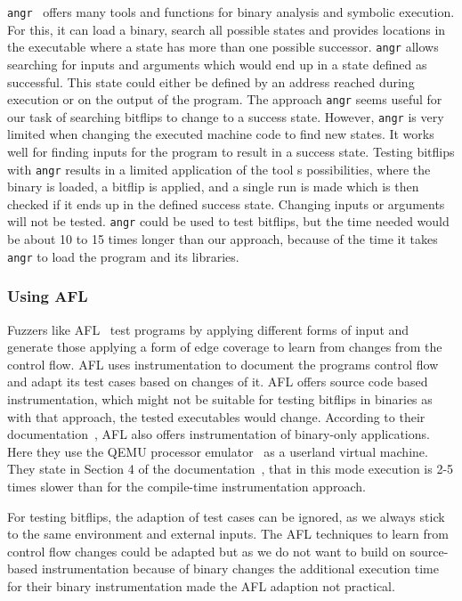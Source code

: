 \texttt{angr}~\cite{angrpaper} offers many tools and functions for binary
analysis and symbolic execution. For this, it can load a binary, search all
possible states and provides locations in the executable where a state has more
than one possible successor. \texttt{angr} allows searching for inputs and
arguments which would end up in a state defined as successful. This state could
either be defined by an address reached during execution or on the output of the
program. The approach \texttt{angr} seems useful for our task of searching
bitflips to change to a success state. However, \texttt{angr} is very limited
when changing the executed machine code to find new states. It works well for
finding inputs for the program to result in a success state. Testing bitflips
with \texttt{angr} results in a limited application of the tool\textquotesingle
s possibilities, where the binary is loaded, a bitflip is applied, and a single
run is made which is then checked if it ends up in the defined success state.
Changing inputs or arguments will not be tested. \texttt{angr} could be used to
test bitflips, but the time needed would be about \num{10} to \num{15} times
longer than our approach, because of the time it takes \texttt{angr} to load
the program and its libraries.

\subsubsection{Using AFL}

Fuzzers like AFL~\cite{aflweb} test programs by applying different forms of
input and generate those applying a form of edge coverage to learn from changes
from the control flow. AFL uses instrumentation to document the
program\textquotesingle s control flow and adapt its test cases based on changes
of it. AFL offers source code based instrumentation, which might not be suitable
for testing bitflips in binaries as with that approach, the tested executables
would change. According to their documentation~\cite{aflreadme}, AFL also offers
instrumentation of binary-only applications. Here they use the QEMU processor
emulator~\cite{qemuweb} as a userland virtual machine. They state in Section 4
of the documentation~\cite{aflreadme}, that in this mode execution is 2-5 times
slower than for the compile-time instrumentation approach.

For testing bitflips, the adaption of test cases can be ignored, as we always
stick to the same environment and external inputs. The AFL techniques to learn
from control flow changes could be adapted but as we do not want to build on
source-based instrumentation because of binary changes the additional execution
time for their binary instrumentation made the AFL adaption not practical.

